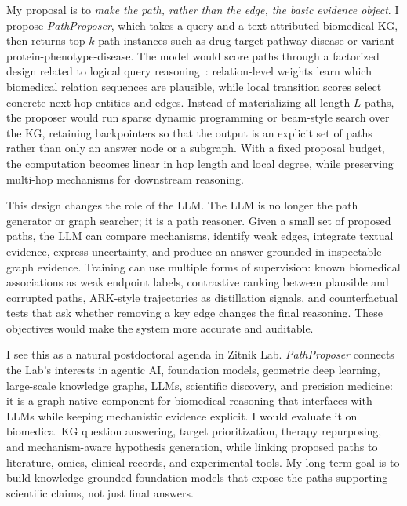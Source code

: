 \documentclass[10pt,letterpaper]{article}
\begin{document}
My proposal is to \textit{make the path, rather than the edge, the basic evidence object}. I propose \textit{PathProposer}, which takes a query and a text-attributed biomedical KG, then returns top-$k$ path instances such as drug-target-pathway-disease or variant-protein-phenotype-disease. The model would score paths through a factorized design related to logical query reasoning~\cite{logicalqueries}: relation-level weights learn which biomedical relation sequences are plausible, while local transition scores select concrete next-hop entities and edges. Instead of materializing all length-$L$ paths, the proposer would run sparse dynamic programming or beam-style search over the KG, retaining backpointers so that the output is an explicit set of paths rather than only an answer node or a subgraph. With a fixed proposal budget, the computation becomes linear in hop length and local degree, while preserving multi-hop mechanisms for downstream reasoning.

This design changes the role of the LLM. The LLM is no longer the path generator or graph searcher; it is a path reasoner. Given a small set of proposed paths, the LLM can compare mechanisms, identify weak edges, integrate textual evidence, express uncertainty, and produce an answer grounded in inspectable graph evidence. Training can use multiple forms of supervision: known biomedical associations as weak endpoint labels, contrastive ranking between plausible and corrupted paths, ARK-style trajectories as distillation signals, and counterfactual tests that ask whether removing a key edge changes the final reasoning. These objectives would make the system more accurate and auditable.

I see this as a natural postdoctoral agenda in Zitnik Lab. \textit{PathProposer} connects the Lab's interests in agentic AI, foundation models, geometric deep learning, large-scale knowledge graphs, LLMs, scientific discovery, and precision medicine: it is a graph-native component for biomedical reasoning that interfaces with LLMs while keeping mechanistic evidence explicit. I would evaluate it on biomedical KG question answering, target prioritization, therapy repurposing, and mechanism-aware hypothesis generation, while linking proposed paths to literature, omics, clinical records, and experimental tools. My long-term goal is to build knowledge-grounded foundation models that expose the paths supporting scientific claims, not just final answers.
\end{document}
